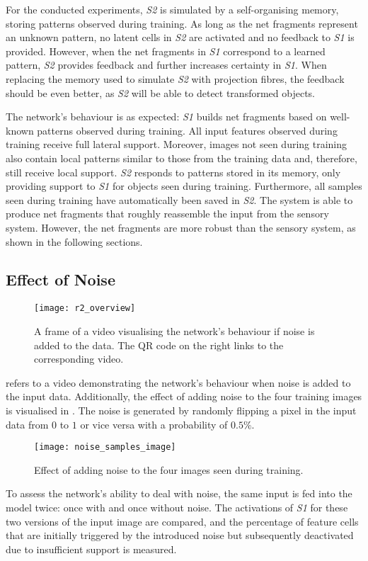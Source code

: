 For the conducted experiments, \emph{S2} is simulated by a self-organising memory, storing patterns observed during training.
As long as the net fragments represent an unknown pattern, no latent cells in \emph{S2} are activated and no feedback to \emph{S1} is provided.
However, when the net fragments in \emph{S1} correspond to a learned pattern, \emph{S2} provides feedback and further increases certainty in \emph{S1}.
When replacing the memory used to simulate \emph{S2} with projection fibres, the feedback should be even better, as \emph{S2} will be able to detect transformed objects.

The network's behaviour is as expected: \emph{S1} builds net fragments based on well-known patterns observed during training.
All input features observed during training receive full lateral support.
Moreover, images not seen during training also contain local patterns similar to those from the training data and, therefore, still receive local support.
\emph{S2} responds to patterns stored in its memory, only providing support to \emph{S1} for objects seen during training. Furthermore, all samples seen during training have automatically been saved in \emph{S2}.
The system is able to produce net fragments that roughly reassemble the input from the sensory system.
However, the net fragments are more robust than the sensory system, as shown in the following sections.

\subsection{Effect of Noise}
%
\begin{figure}[h]
    \centering
    \texttt{[image: r2\_overview]}
    \caption[Video visualising the network's behaviour with noise in input]{A frame of a video visualising the network's behaviour if noise is added to the data. The QR code on the right links to the corresponding video.}
\end{figure}
%
 refers to a video demonstrating the network's behaviour when noise is added to the input data.
Additionally, the effect of adding noise to the four training images is visualised in .
The noise is generated by randomly flipping a pixel in the input data from $0$ to $1$ or vice versa with a probability of $0.5\%$.

\begin{figure}[h]
    \centering
    \texttt{[image: noise\_samples\_image]}
    \caption[Effect of adding noise to the training images]{Effect of adding noise to the four images seen during training.}
\end{figure}
%
To assess the network's ability to deal with noise, the same input is fed into the model twice: once with and once without noise. The activations of \emph{S1} for these two versions of the input image are compared, and the percentage of feature cells that are initially triggered by the introduced noise but subsequently deactivated due to insufficient support is measured.

